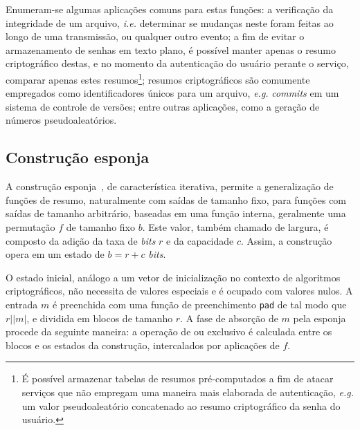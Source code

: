 \documentclass{ufsctex/ufsctex}
\newcommand{\length}[1]{\vert{} #1 \vert{}}
\begin{document}
Enumeram-se algumas aplicações comuns para estas funções: a verificação da
integridade de um arquivo, \emph{i.e.} determinar se mudanças neste foram
feitas ao longo de uma transmissão, ou qualquer outro evento; a fim de evitar o
armazenamento de senhas em texto plano, é possível manter apenas o resumo
criptográfico destas, e no momento da autenticação do usuário perante o
serviço, comparar apenas estes resumos\footnote{É possível armazenar tabelas de
resumos pré-computados a fim de atacar serviços que não empregam uma maneira
mais elaborada de autenticação, \emph{e.g.} um valor pseudoaleatório
concatenado ao resumo criptográfico da senha do usuário.}; resumos
criptográficos são comumente empregados como identificadores únicos para um
arquivo, \emph{e.g.} \emph{commits} em um sistema de controle de versões;
entre outras aplicações, como a geração de números pseudoaleatórios.

\subsection{Construção esponja}\label{subsection:sponge}

A construção esponja~\cite{Bertoni:misc:2011a:jan}, de característica iterativa,
permite a generalização de funções de resumo, naturalmente com saídas de
tamanho fixo, para funções com saídas de tamanho arbitrário, baseadas em uma
função interna, geralmente uma permutação $f$ de tamanho fixo $b$. Este valor,
também chamado de largura, é composto da adição da taxa de \emph{bits} $r$ e da
capacidade $c$. Assim, a construção opera em um estado de $b = r + c$
\emph{bits}.

O estado inicial, análogo a um vetor de inicialização no contexto de algoritmos
criptográficos, não necessita de valores especiais e é ocupado com valores
nulos. A entrada $m$ é preenchida com uma função de preenchimento \texttt{pad}
de tal modo que $r \mid \length{m}$, e dividida em blocos de tamanho $r$. A
fase de absorção de $m$ pela esponja procede da seguinte maneira: a operação de
ou exclusivo é calculada entre os blocos e os estados da construção,
intercalados por aplicações de $f$.
\end{document}
